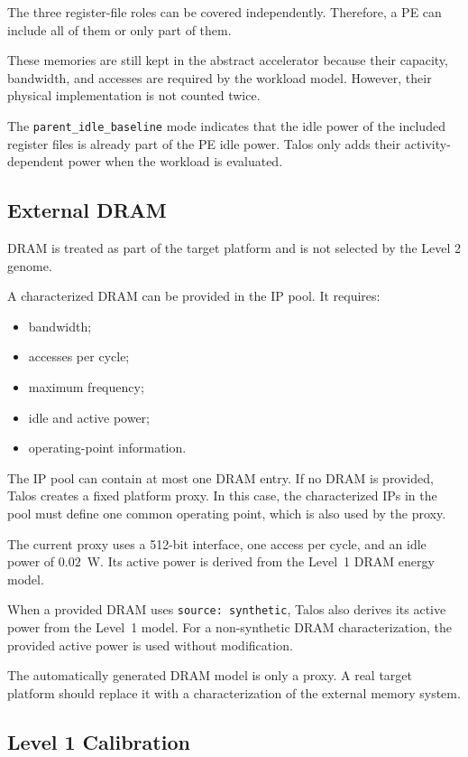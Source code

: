 The three register-file roles can be covered independently. Therefore,
a PE can include all of them or only part of them.

These memories are still kept in the abstract accelerator because
their capacity, bandwidth, and accesses are required by the workload
model. However, their physical implementation is not counted twice.

The \texttt{parent\_idle\_baseline} mode indicates that the idle power
of the included register files is already part of the PE idle power.
Talos only adds their activity-dependent power when the workload is
evaluated.


\subsection{External DRAM}

DRAM is treated as part of the target platform and is not selected by
the Level 2 genome.

A characterized DRAM can be provided in the IP pool. It requires:

\begin{itemize}
    \item bandwidth;
    \item accesses per cycle;
    \item maximum frequency;
    \item idle and active power;
    \item operating-point information.
\end{itemize}

The IP pool can contain at most one DRAM entry. If no DRAM is
provided, Talos creates a fixed platform proxy. In this case, the
characterized IPs in the pool must define one common operating point,
which is also used by the proxy.

The current proxy uses a 512-bit interface, one access per cycle, and
an idle power of $0.02$~W. Its active power is derived from the
Level~1 DRAM energy model.

When a provided DRAM uses \texttt{source: synthetic}, Talos also
derives its active power from the Level~1 model. For a non-synthetic
DRAM characterization, the provided active power is used without
modification.

The automatically generated DRAM model is only a proxy. A real target
platform should replace it with a characterization of the external
memory system.


\subsection{Level 1 Calibration}

